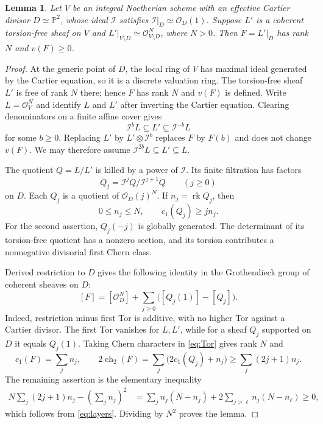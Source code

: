 \documentclass[11pt]{article}
\newtheorem{lemma}[theorem]{Lemma}
\theoremstyle{remark}
\newcommand{\PP}{\mathbb P}
\newcommand{\cO}{\mathcal O}
\newcommand{\cI}{\mathcal I}
\DeclareMathOperator{\rk}{rk}
\DeclareMathOperator{\ch}{ch}
\begin{document}
\begin{lemma}\label{lem:lattice}
Let $V$ be an integral Noetherian scheme with an effective Cartier
divisor $D\simeq\PP^2$, whose ideal $\cI$ satisfies
$\cI|_D\simeq\cO_D(1)$. Suppose $L'$ is a coherent torsion-free sheaf
on $V$ and $L'|_{V\setminus D}\simeq\cO_{V\setminus D}^N$, where $N>0$.
Then $F=L'|_D$ has rank $N$ and $v(F)\geq0$.
\end{lemma}
\begin{proof}
At the generic point of $D$, the local ring of $V$ has maximal ideal
generated by the Cartier equation, so it is a discrete valuation ring.
The torsion-free sheaf $L'$ is free of rank $N$ there; hence $F$ has rank
$N$ and $v(F)$ is defined.
Write $L=\cO_V^N$ and identify $L$ and $L'$ after inverting the Cartier
equation. Clearing denominators on a finite affine cover gives
\[
 \cI^b L\subseteq L'\subseteq\cI^{-b}L
\]
for some $b\geq0$. Replacing $L'$ by $L'\otimes\cI^b$ replaces $F$ by
$F(b)$ and does not change $v(F)$. We may therefore assume
$\cI^{2b}L\subseteq L'\subseteq L$.

The quotient $Q=L/L'$ is killed by a power of $\cI$. Its finite
filtration has factors
\[
 Q_j=\cI^jQ/\cI^{j+1}Q\qquad(j\geq0)
\]
on $D$. Each $Q_j$ is a quotient of $\cO_D(j)^N$. If $n_j=\rk Q_j$,
then
\begin{equation}\label{eq:layers}
 0\leq n_j\leq N,\qquad c_1(Q_j)\geq jn_j.
\end{equation}
For the second assertion, $Q_j(-j)$ is globally generated. The
determinant of its torsion-free quotient has a nonzero section, and its
torsion contributes a nonnegative divisorial first Chern class.

Derived restriction to $D$ gives the following identity in the
Grothendieck group of coherent sheaves on $D$:
\begin{equation}\label{eq:Tor}
 [F]=[\cO_D^N]+\sum_{j\geq0}\bigl([Q_j(1)]-[Q_j]\bigr).
\end{equation}
Indeed, restriction minus first Tor is additive, with no higher Tor
against a Cartier divisor. The first Tor vanishes for $L,L'$, while
for a sheaf $Q_j$ supported on $D$ it equals $Q_j(1)$.
Taking Chern characters in \eqref{eq:Tor} gives rank $N$ and
\[
 c_1(F)=\sum_j n_j,\qquad
 2\ch_2(F)=\sum_j\bigl(2c_1(Q_j)+n_j\bigr)
 \geq\sum_j(2j+1)n_j.
\]
The remaining assertion is the elementary inequality
\begin{align*}
 N\sum_j(2j+1)n_j-\left(\sum_jn_j\right)^2
 &=\sum_jn_j(N-n_j)
   +2\sum_{j>\ell}n_j(N-n_\ell)\geq0,
\end{align*}
which follows from \eqref{eq:layers}. Dividing by $N^2$ proves the lemma.
\end{proof}
\end{document}
